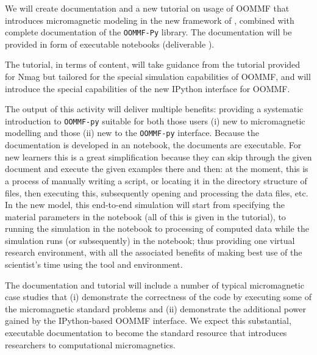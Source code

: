 \begin{workpackage}
\begin{tasklist}
\begin{task}[lead=USO,title=\OOMMFNB{} demonstrator: executable tutorial and
  documentation, id=oommf-tutorial-and-documentation, PM=7]

  We will create documentation and a new tutorial on usage of OOMMF
  that introduces micromagnetic modeling in the new framework of
  \OOMMFNB{}, combined with complete documentation of the
  \texttt{OOMMF-Py} library. The documentation will be provided in
  form of executable \Jupyter notebooks (deliverable ).

  The tutorial, in terms of content, will take guidance from the
  tutorial provided for Nmag \cite{Nmag-tutorial-url} but tailored for the
  special simulation capabilities of OOMMF, and will introduce the
  special capabilities of the new IPython interface for OOMMF.

  The output of this activity will deliver multiple benefits:
  providing a systematic introduction to \texttt{OOMMF-py} suitable for both
  those users (i) new to micromagnetic modelling and those (ii) new to
  the \texttt{OOMMF-py} interface. Because the documentation is developed in an
  \Jupyter notebook, the documents are executable. For new learners
  this is a great simplification because they can skip through the
  given document and execute the given examples there and then: at the
  moment, this is a process of manually writing a script, or locating
  it in the directory structure of files, then executing this,
  subsequently opening and processing the data files, etc. In the new
  model, this end-to-end simulation will start from specifying the
  material parameters in the notebook (all of this is given in the
  tutorial), to running the simulation in the notebook to processing
  of computed data while the simulation runs (or subsequently) in the
  notebook; thus providing one virtual research environment, with all
  the associated benefits of making best use of the scientist's time
  using the tool and environment.

  The documentation and tutorial will include a number of typical
  micromagnetic case studies that (i) demonstrate the correctness of
  the code by executing some of the micromagnetic standard problems
  and (ii) demonstrate the additional power gained by the
  IPython-based OOMMF interface. We expect this substantial, executable
  documentation to become the standard resource that introduces
  researchers to computational micromagnetics.
\end{task}


\end{tasklist}
\end{workpackage}
